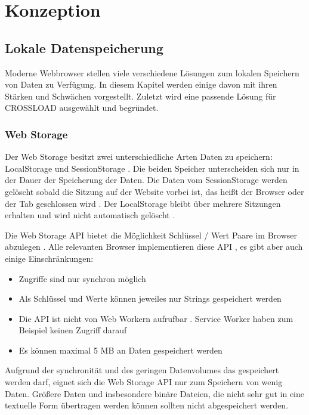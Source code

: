 \chapter{Konzeption}
\label{Kap4}

\section{Lokale Datenspeicherung}
Moderne Webbrowser stellen viele verschiedene Lösungen zum lokalen Speichern von Daten zu Verfügung. In diesem Kapitel werden einige davon mit ihren Stärken und Schwächen vorgestellt. Zuletzt wird eine passende Lösung für CROSSLOAD ausgewählt und begründet.

\subsection{Web Storage}
Der Web Storage besitzt zwei unterschiedliche Arten Daten zu speichern: LocalStorage und SessionStorage \autocite{Hajian2019} \autocite{mdn-web-storage}. Die beiden Speicher unterscheiden sich nur in der Dauer der Speicherung der Daten. Die Daten vom SessionStorage werden gelöscht sobald die Sitzung auf der Website vorbei ist, das heißt der Browser oder der Tab geschlossen wird \autocite{Hajian2019} \autocite{mdn-web-storage}. Der LocalStorage bleibt über mehrere Sitzungen erhalten und wird nicht automatisch gelöscht \autocite{Hajian2019} \autocite{mdn-web-storage}. 

Die Web Storage \ac{API} bietet die Möglichkeit Schlüssel / Wert Paare im Browser abzulegen \autocite{mdn-web-storage}. Alle relevanten Browser implementieren diese \ac{API} \autocite{mdn-web-storage}, es gibt aber auch einige Einschränkungen:

\begin{itemize}
	\item Zugriffe sind nur synchron möglich \autocite{Hajian2019}
	\item Als Schlüssel und Werte können jeweiles nur Strings gespeichert werden \autocite{Hajian2019}
	\item Die \ac{API} ist nicht von Web Workern aufrufbar \autocite{Hajian2019}. Service Worker haben zum Beispiel keinen Zugriff darauf
	\item Es können maximal 5 \ac{MB} an Daten gespeichert werden \autocite{mdn-web-storage}
\end{itemize}

Aufgrund der synchronität und des geringen Datenvolumes das gespeichert werden darf, eignet sich die Web Storage \ac{API} nur zum Speichern von wenig Daten. Größere Daten und insbesondere binäre Dateien, die nicht sehr gut in eine textuelle Form übertragen werden können sollten nicht abgespeichert werden. 

